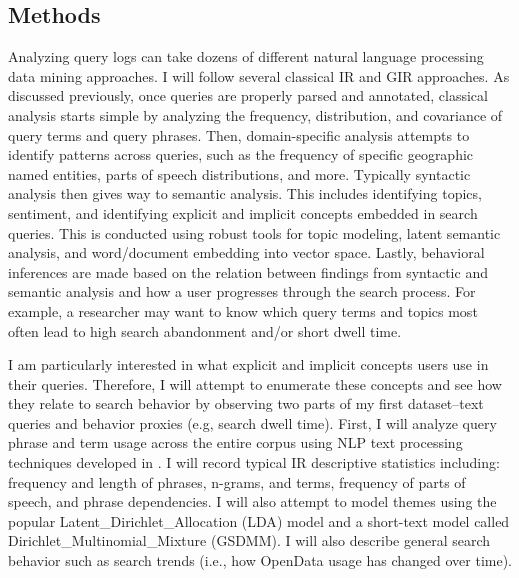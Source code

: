 \subsection{Methods}
Analyzing query logs can take dozens of different natural language processing data mining approaches. I will follow several classical IR and GIR approaches. As discussed previously, once queries are properly parsed and annotated, classical analysis starts simple by analyzing the frequency, distribution, and covariance of query terms and query phrases. Then, domain-specific analysis attempts to identify patterns across queries, such as the frequency of specific geographic named entities, parts of speech distributions, and more. Typically syntactic analysis then gives way to semantic analysis. This includes identifying topics, sentiment, and identifying explicit and implicit concepts embedded in search queries. This is conducted using robust tools for topic modeling, latent semantic analysis, and word/document embedding into vector space. Lastly, behavioral inferences are made based on the relation between findings from syntactic and semantic analysis and how a user progresses through the search process. For example, a researcher may want to know which query terms and topics most often lead to high search abandonment and/or short dwell time.

I am particularly interested in what explicit and implicit concepts users use in their queries. Therefore, I will attempt to enumerate these concepts and see how they relate to search behavior by observing two parts of my first dataset–text queries and behavior proxies (e.g, search dwell time). First, I will analyze query phrase and term usage across the entire corpus using NLP text processing techniques developed in \cite{Sanderson2007} \cite{Dittrich2015} \cite{Derungs2016} \cite{Gablasova2017} \cite{Hamzei2019b}. I will record typical IR descriptive statistics including: frequency and length of phrases, n-grams, and terms, frequency of parts of speech, and phrase dependencies. I will also attempt to model themes using the popular \gls{Latent_Dirichlet_Allocation} (\acrshort{LDA}) model and a short-text model called \gls{Dirichlet_Multinomial_Mixture} (\acrshort{GSDMM}). I will also describe general search behavior such as search trends (i.e., how OpenData usage has changed over time).

